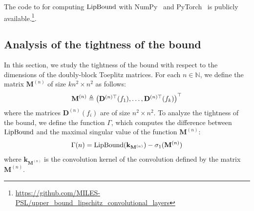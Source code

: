 The code to for computing $\operatorname{LipBound}$ with NumPy~\cite{numpy} and PyTorch~\cite{paszke2019pytorch} is publicly available.\footnote{\url{https://github.com/MILES-PSL/upper_bound_lipschitz_convolutional_layers}}.


\subsection{Analysis of the tightness of the bound}
\label{sec:analysis_tightness_bound}

In this section, we study the tightness of the bound with respect to the dimensions of the doubly-block Toeplitz matrices.
For each $n \in \mathbb{N}$, we define the matrix  $\mathbf{M}^{(n)}$ of size $kn^2 \times n^2$ as follows:
\begin{equation}
  \mathbf{M}^{(n)} \triangleq \textstyle \leftmat \mathbf{D}^{(n)\top}(f_1), \dots, \mathbf{D}^{(n)\top}(f_k) \textstyle \rightmat^\top
\end{equation}
where the matrices $\mathbf{D}^{(n)}(f_i)$ are of size $n^2 \times n^2$. 
To analyze the tightness of the bound, we define the function $\Gamma$, which computes the difference between $\operatorname{LipBound}$ and the maximal singular value of the function $\mathbf{M}^{(n)}$:
\begin{equation} \label{eq:function_convergence}
  \Gamma(n) = \operatorname{LipBound}(\mathbf{k}_{\mathbf{M}^{(n)}}) - \sigma_1(\mathbf{M}^{(n)})
\end{equation}
where $\mathbf{k}_{\mathbf{M}^{(n)}}$ is the  convolution kernel of the convolution defined by the matrix $\mathbf{M}^{(n)}$.




